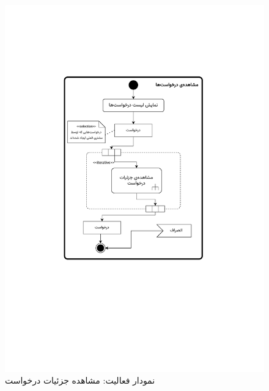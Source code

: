 \begin{figure}[ht!]
	\centering
	\includegraphics[scale=0.8, page=2]{figs/OOD-activity11-20.pdf}
	\caption{نمودار فعالیت: مشاهده جزئیات درخواست}
\end{figure}
\FloatBarrier
\newpage

